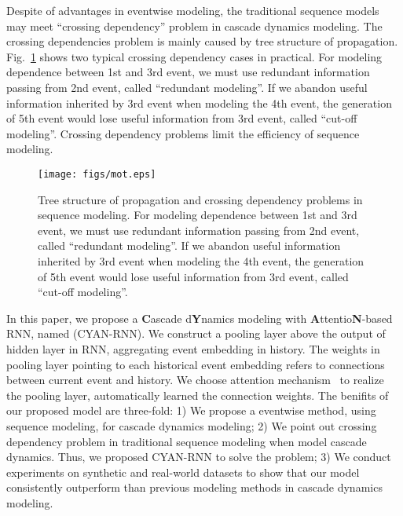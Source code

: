 Despite of advantages in eventwise modeling, the traditional sequence models
may meet ``crossing dependency'' problem in cascade dynamics modeling.
The crossing dependencies problem is mainly caused by tree structure of
propagation. Fig.~\ref{fig:mot} shows two typical crossing dependency
cases in practical. For modeling dependence between 1st and 3rd event, we must
use redundant information passing from 2nd event, called
``redundant modeling''. If we abandon useful information inherited by 3rd
event when modeling the 4th event, the generation of 5th event would lose
useful information from 3rd event, called ``cut-off modeling''. Crossing
dependency problems limit the efficiency of sequence modeling.

\begin{figure}[ht!]
\label{fig:mot}
\centering
\texttt{[image: figs/mot.eps]}
\caption{Tree structure of propagation and crossing dependency problems in
sequence modeling. For modeling dependence between 1st and 3rd event, we must
use redundant information passing from 2nd event, called
``redundant modeling''. If we abandon useful information inherited by 3rd
event when modeling the 4th event, the generation of 5th event would lose
useful information from 3rd event, called ``cut-off modeling''.
}
\end{figure}

In this paper, we propose a \textbf{C}ascade d\textbf{Y}namics modeling with
\textbf{A}ttentio\textbf{N}-based RNN, named (CYAN-RNN). We construct a pooling
layer above the output of hidden layer in RNN, aggregating event embedding in
history. The weights in pooling layer pointing to each historical event
embedding refers to connections between current event and history. We choose
attention mechanism~\cite{bahdanau2014neural} to realize the pooling layer,
automatically learned the connection weights. The benifits of our proposed model
are three-fold: 1) We propose a eventwise method, using sequence modeling, for
cascade dynamics modeling; 2) We point out crossing dependency problem in
traditional sequence modeling when model cascade dynamics. Thus, we
proposed CYAN-RNN to solve the problem; 3) We conduct experiments on synthetic
and real-world datasets to show that our model consistently outperform than
previous modeling methods in cascade dynamics modeling.

% 

% 
% 

% 
